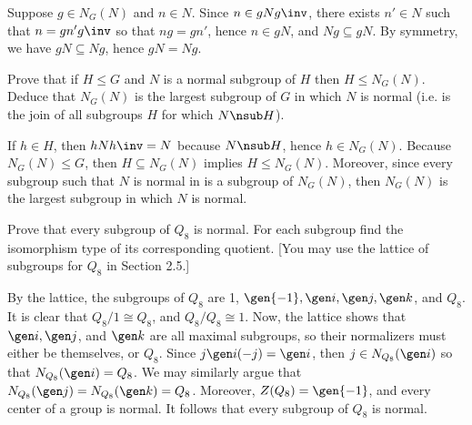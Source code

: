 \begin{problems}
\begin{sol}
        \noindent \leftimp Suppose $g \in N_G(N)$ and $n \in N$. Since $n \in gNg\inv$, there exists $n' \in N$ such that $n = gn'g\inv$ so that $ng = gn'$, hence $n \in gN$, and $Ng \subseteq gN$. By symmetry, we have $gN \subseteq Ng$, hence $gN = Ng$.
    \end{sol}
    \item Prove that if $H \le G$ and $N$ is a normal subgroup of $H$ then $H \le N_G(N)$. Deduce that $N_G(N)$ is the largest subgroup of $G$ in which $N$ is normal (i.e. is the join of all subgroups $H$ for which $N \nsub H$).
    \begin{sol}
        If $h \in H$, then $hNh\inv = N$ because $N \nsub H$, hence $h \in N_G(N)$. Because $N_G(N) \leq G$, then $H \subseteq N_G(N)$ implies $H \leq N_G(N)$. Moreover, since every subgroup such that $N$ is normal in is a subgroup of $N_G(N)$, then $N_G(N)$ is the largest subgroup in which $N$ is normal.
    \end{sol}
    \item Prove that every subgroup of $Q_8$ is normal. For each subgroup find the isomorphism type of its corresponding quotient. [You may use the lattice of subgroups for $Q_8$ in Section 2.5.]
    \begin{sol}
        By the lattice, the subgroups of $Q_8$ are 1, $\gen{-1}, \gen i, \gen j, \gen k$, and $Q_8$. It is clear that $Q_8/1 \cong Q_8$, and $Q_8/Q_8 \cong 1$. Now, the lattice shows that $\gen i, \gen j$, and $\gen k$ are all maximal subgroups, so their normalizers must either be themselves, or $Q_8$. Since $j\gen i (-j) = \gen i$, then $j \in N_{Q_8}(\gen i)$ so that $N_{Q_8}(\gen i) = Q_8$. We may similarly argue that $N_{Q_8}(\gen j) = N_{Q_8}(\gen k) = Q_8$. Moreover, $Z(Q_8) = \gen{-1}$, and every center of a group is normal. It follows that every subgroup of $Q_8$ is normal.
        

\end{sol}
\end{problems}
